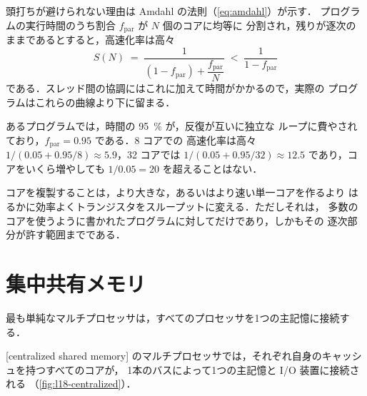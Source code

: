 \documentclass[../main.tex]{subfiles}
\begin{document}
\begin{marginfigure}
  \resizebox{\linewidth}{!}{}
  \caption{$N$ コアでの高速化率: 理想的なスケーリングと
    \cref{eq:l18-amdahl-cores}．}
  \label{fig:l18-scaling}
\end{marginfigure}
頭打ちが避けられない理由は Amdahl の法則（\cref{eq:amdahl}）が示す．
プログラムの実行時間のうち割合 $f_{\mathrm{par}}$ が $N$ 個のコアに均等に
分割され，残りが逐次のままであるとすると，高速化率は高々
\begin{equation}
  S(N) \;=\; \frac{1}{(1-f_{\mathrm{par}}) + \dfrac{f_{\mathrm{par}}}{N}}
  \;<\; \frac{1}{1-f_{\mathrm{par}}}
  \label{eq:l18-amdahl-cores}
\end{equation}
である．スレッド間の協調にはこれに加えて時間がかかるので，実際の
プログラムはこれらの曲線より下に留まる．

\begin{example}
  あるプログラムでは，時間の \SI{95}{\percent} が，反復が互いに独立な
  ループに費やされており，$f_{\mathrm{par}}=0.95$ である．8 コアでの
  高速化率は高々 $1/(0.05+0.95/8)\approx 5.9$，32 コアでは
  $1/(0.05+0.95/32)\approx 12.5$ であり，コアをいくら増やしても
  $1/0.05 = 20$ を超えることはない．
\end{example}

\begin{keypoint}
  コアを複製することは，より大きな，あるいはより速い単一コアを作るより
  はるかに効率よくトランジスタをスループットに変える．ただしそれは，
  多数のコアを使うように書かれたプログラムに対してだけであり，しかもその
  逐次部分が許す範囲までである．
\end{keypoint}

\section{集中共有メモリ}
\label{sec:l18-centralized}

最も単純なマルチプロセッサは，すべてのプロセッサを1つの主記憶に接続する．

\begin{definition}[集中共有メモリ]
  [centralized shared memory]%
  のマルチプロセッサでは，それぞれ自身のキャッシュを持つすべてのコアが，
  1本のバスによって1つの主記憶と I/O 装置に接続される
  （\cref{fig:l18-centralized}）．
\end{definition}
\end{document}
